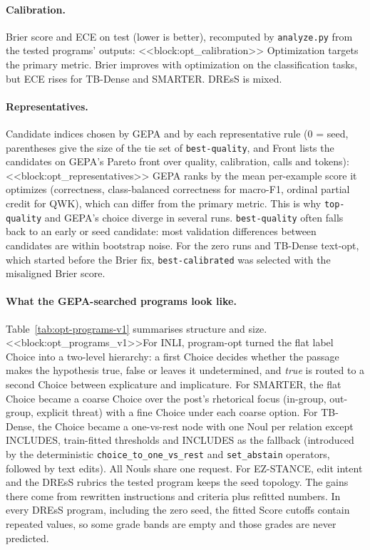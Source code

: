 \paragraph{Calibration.}
Brier score and ECE on test (lower is better), recomputed by \texttt{analyze.py} from the tested programs' outputs:
<<block:opt_calibration>>
Optimization targets the primary metric. Brier improves with optimization on the classification tasks, but ECE rises for TB-Dense and SMARTER. DREsS is mixed.

\paragraph{Representatives.}
Candidate indices chosen by GEPA and by each representative rule (0 = seed, parentheses give the size of the tie set of \texttt{best-quality}, and Front lists the candidates on GEPA's Pareto front over quality, calibration, calls and tokens):
<<block:opt_representatives>>
GEPA ranks by the mean per-example score it optimizes (correctness, class-balanced correctness for macro-F1, ordinal partial credit for QWK), which can differ from the primary metric. This is why \texttt{top-quality} and GEPA's choice diverge in several runs. \texttt{best-quality} often falls back to an early or seed candidate: most validation differences between candidates are within bootstrap noise. For the zero runs and TB-Dense text-opt, which started before the Brier fix, \texttt{best-calibrated} was selected with the misaligned Brier score.

\paragraph{What the GEPA-searched programs look like.}
Table~\ref{tab:opt-programs-v1} summarises structure and size.
<<block:opt_programs_v1>>For INLI, program-opt turned the flat label Choice into a two-level hierarchy: a first Choice decides whether the passage makes the hypothesis true, false or leaves it undetermined, and \emph{true} is routed to a second Choice between explicature and implicature. For SMARTER, the flat Choice became a coarse Choice over the post's rhetorical focus (in-group, out-group, explicit threat) with a fine Choice under each coarse option. For TB-Dense, the Choice became a one-vs-rest node with one Noul per relation except INCLUDES, train-fitted thresholds and INCLUDES as the fallback (introduced by the deterministic \texttt{choice\_to\_one\_vs\_rest} and \texttt{set\_abstain} operators, followed by text edits). All Nouls share one request. For EZ-STANCE, edit intent and the DREsS rubrics the tested program keeps the seed topology. The gains there come from rewritten instructions and criteria plus refitted numbers. In every DREsS program, including the zero seed, the fitted Score cutoffs contain repeated values, so some grade bands are empty and those grades are never predicted.

